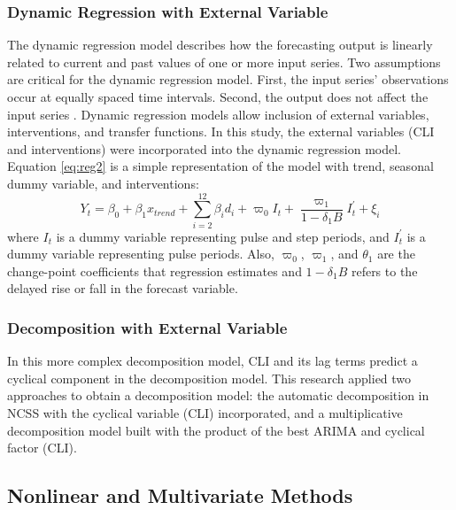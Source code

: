 \subsubsection{Dynamic Regression with External Variable}
The dynamic regression model describes how the forecasting output is linearly related to current and past values of one or more input series. Two assumptions are critical for the dynamic regression model. First, the input series' observations occur at equally spaced time intervals. Second, the output does not affect the input series \citep{pankratz2012}. Dynamic regression models allow inclusion of external variables, interventions, and transfer functions. In this study, the external variables (CLI and interventions) were incorporated into the dynamic regression model. Equation \ref{eq:reg2} is a simple representation of the model with trend, seasonal dummy variable, and interventions:
\begin{equation}
Y_t = \beta_0+\beta_1 x_{trend} + \sum_{i=2}^{12} {\beta_i d_i}+\varpi_0 I_t +\frac{\varpi_1}{1-\delta_1 B} I^{'}_t +\xi_i
\label{eq:reg2}
\end{equation}
where $I_t$ is a dummy variable representing pulse and step periods, and $I^{'}_t$ is a dummy variable representing pulse periods. Also, $\varpi_0$, $\varpi_1$, and $\theta_1$ are the change-point coefficients that regression estimates and $1-\delta_1 B$ refers to the delayed rise or fall in the forecast variable.
  
\subsubsection{Decomposition with External Variable}
In this more complex decomposition model, CLI and its lag terms predict   a cyclical component in the decomposition model. This research applied two approaches to obtain a decomposition model: the automatic decomposition in NCSS with the cyclical variable (CLI) incorporated, and a multiplicative decomposition model built with the product of the best ARIMA and cyclical factor (CLI). 
\subsection{Nonlinear and Multivariate Methods}
